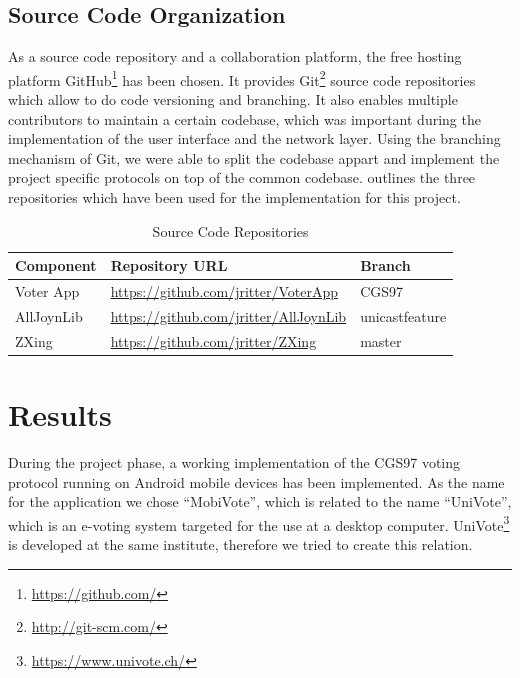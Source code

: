 \documentclass[numbers=noenddot, abstract=on, a4paper, headsepline,
footsepline, oneside, draft=off]{scrreprt}
\begin{document}
\section{Source Code Organization}
As a source code repository and a collaboration platform, the free hosting
platform GitHub\footnote{\url{https://github.com/}} has been chosen. It
provides Git\footnote{\url{http://git-scm.com/}} source code repositories which
allow to do code versioning and branching. It also enables multiple contributors to maintain a certain codebase,
which was important during the implementation of the user interface and the
network layer. Using the branching mechanism of Git, we were able to split the
codebase appart and implement the project specific protocols on top of the
common codebase.  outlines the three
repositories which have been used for the implementation for this project.

\begin{table}[htbp]
	\centering
	\renewcommand{\arraystretch}{1.4}
	\begin{minipage}{\linewidth}
	\begin{tabularx}{\textwidth}{lll}
		\toprule
		\textbf{Component}	&  \textbf{Repository URL} & \textbf{Branch} 	\\
		\midrule
		Voter App			& \url{https://github.com/jritter/VoterApp}	& CGS97	\\
		AllJoynLib		  	& \url{https://github.com/jritter/AllJoynLib}	& unicastfeature	
		\\
		ZXing				& \url{https://github.com/jritter/ZXing}		& master	\\
		\bottomrule
	\end{tabularx}
	\end{minipage}
	\renewcommand{\arraystretch}{1}
	\caption{Source Code Repositories}
	\label{tab:sourcecoderepositories}
\end{table} 

\chapter{Results}
\label{cha:results}
During the project phase, a working implementation of the CGS97 voting protocol
running on Android mobile devices has been implemented. As the name for the
application we chose ``MobiVote'', which is related to the name ``UniVote'',
which is an e-voting system targeted for the use at a desktop computer.
UniVote\footnote{\url{https://www.univote.ch/}} is developed at the same
institute, therefore we tried to create this relation.
\end{document}
